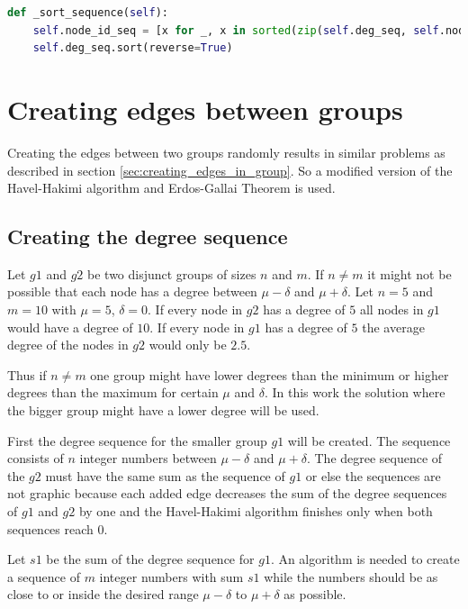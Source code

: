 \begin{lstlisting}[language=python, caption={Sorting degrees and node ids}, label={lst:sorting}]
def _sort_sequence(self):
    self.node_id_seq = [x for _, x in sorted(zip(self.deg_seq, self.node_id_seq), reverse=True)]
    self.deg_seq.sort(reverse=True)
\end{lstlisting}

\section{Creating edges between groups}
Creating the edges between two groups randomly results in similar problems as described in section \ref{sec:creating_edges_in_group}. So a modified version of the Havel-Hakimi algorithm and Erdos-Gallai Theorem is used.

\subsection{Creating the degree sequence}
Let $g1$ and $g2$ be two disjunct groups of sizes $n$ and $m$. If $n \neq m$ it might not be possible that each node has a degree between $\mu - \delta$ and $\mu + \delta$. Let $n = 5$ and $m = 10$ with $\mu = 5$, $\delta = 0$. If every node in $g2$ has a degree of $5$ all nodes in $g1$ would have a degree of $10$. If every node in $g1$ has a degree of $5$ the average degree of the nodes in $g2$ would only be $2.5$.

Thus if $n \neq m$ one group might have lower degrees than the minimum or higher degrees than the maximum for certain $\mu$ and $\delta$. In this work the solution where the bigger group might have a lower degree will be used.
\newline

First the degree sequence for the smaller group $g1$ will be created. The sequence consists of $n$ integer numbers between $\mu - \delta$ and $\mu + \delta$. The degree sequence of the $g2$ must have the same sum as the sequence of $g1$ or else the sequences are not graphic because each added edge decreases the sum of the degree sequences of $g1$ and $g2$ by one and the Havel-Hakimi algorithm finishes only when both sequences reach $0$.
\newline

Let $s1$ be the sum of the degree sequence for $g1$. An algorithm is needed to create a sequence of $m$ integer numbers with sum $s1$ while the numbers should be as close to or inside the desired range $\mu - \delta$ to $\mu + \delta$ as possible.

